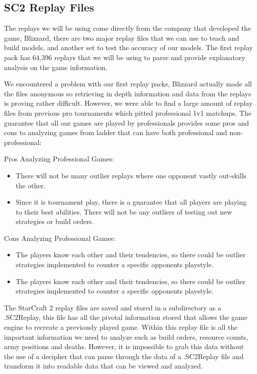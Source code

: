 \documentclass[a4paper,12pt]{report}
\begin{document}
\subsection{SC2 Replay Files}
The replays we will be using come directly from the company that developed the game, Blizzard, there are two major replay files that we can use to teach and build models, and another set to test the accuracy of our models. The first replay pack has 64,396 replays that we will be using to parse and provide explanatory analysis on the game information.

We encountered a problem with our first replay packs, Blizzard actually made all the files anonymous so retrieving in depth information and data from the replays is proving rather difficult. However, we were able to find a large amount of replay files from previous pro tournaments which pitted professional 1v1 matchups. The guarantee that all our games are played by professionals provides some pros and cons to analyzing games from ladder that can have both professional and non-professional:

Pros Analyzing Professional Games:
\vspace*{-.8cm}
\begin{itemize}[,]
    \setlength\itemsep{-.1cm}
    \item There will not be many outlier replays where one opponent vastly out-skills the other.
    \item Since it is tournament play, there is a guarantee that all players are playing to their best abilities. There will not be any outliers of testing out new strategies or build orders.
\end{itemize}

Cons Analyzing Professional Games:
\vspace*{-.775cm}
\begin{itemize}[,]
    \setlength\itemsep{-.1cm}
    \item The players know each other and their tendencies, so there could be outlier strategies implemented to counter a specific opponents playstyle.
    \item The players know each other and their tendencies, so there could be outlier strategies implemented to counter a specific opponents playstyle.
\end{itemize}

The StarCraft 2 replay files are saved and stored in a subdirectory as a .SC2Replay, this file has all the pivotal information stored that allows the game engine to recreate a previously played game. Within this replay file is all the important information we need to analyze such as build orders, resource counts, army positions and deaths. However, it is impossible to grab this data without the use of a decipher that can parse through the data of a .SC2Replay file and transform it into readable data that can be viewed and analyzed.
\end{document}
